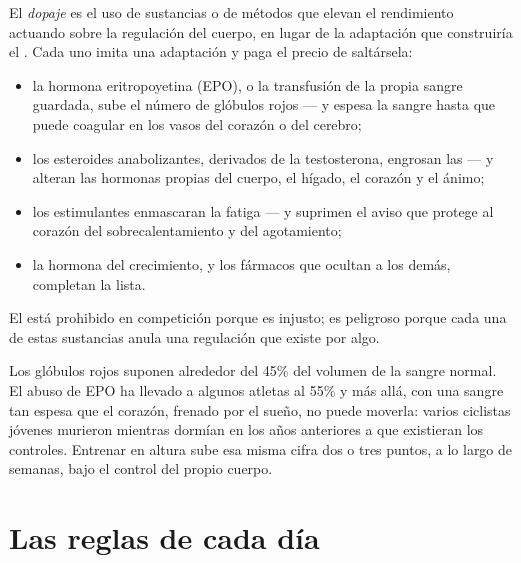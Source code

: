 \begin{proposition}[El dopaje]\label{prop:g10:sport-and-health:doping}
El \emph{dopaje} es el uso de sustancias o de métodos que
elevan el rendimiento actuando sobre la regulación del cuerpo, en lugar
de la adaptación que construiría el . Cada uno imita una
adaptación y paga el precio de saltársela:
\begin{itemize}
  \item la hormona eritropoyetina (EPO), o la transfusión de la propia
        sangre guardada, sube el número de glóbulos rojos --- y espesa
        la sangre hasta que puede coagular en los vasos del corazón o
        del cerebro;
  \item los esteroides anabolizantes, derivados de la testosterona,
        engrosan las  --- y alteran las hormonas
        propias del cuerpo, el hígado, el corazón y el ánimo;
  \item los estimulantes enmascaran la fatiga --- y suprimen el aviso
        que protege al corazón del sobrecalentamiento y del
        agotamiento;
  \item la hormona del crecimiento, y los fármacos que ocultan a los
        demás, completan la lista.
\end{itemize}
El  está prohibido en competición porque es injusto; es peligroso
porque cada una de estas sustancias anula una regulación que existe por
algo.
\end{proposition}
\admitted

\begin{example}\label{ex:g10:sport-and-health:epo}
Los glóbulos rojos suponen alrededor del 45\% del volumen de la sangre
normal. El abuso de EPO ha llevado a algunos atletas al 55\% y más
allá, con una sangre tan espesa que el corazón, frenado por el sueño,
no puede moverla: varios ciclistas jóvenes murieron mientras dormían en
los años anteriores a que existieran los controles. Entrenar en altura
sube esa misma cifra dos o tres puntos, a lo largo de semanas, bajo el
control del propio cuerpo.
\end{example}

\section{Las reglas de cada día}

